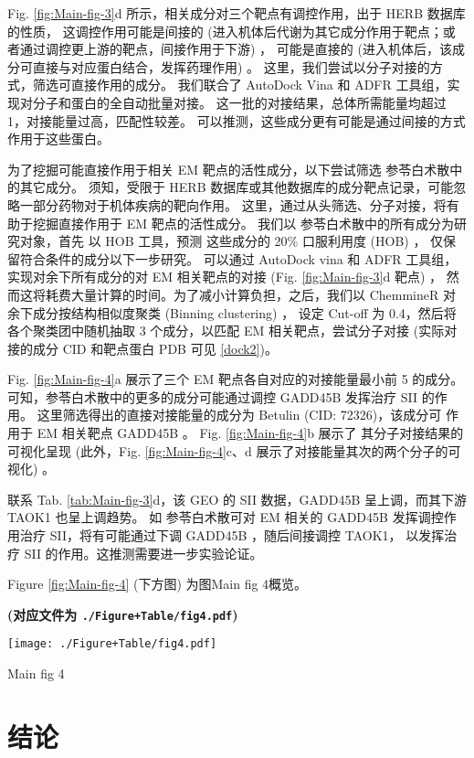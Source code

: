 \documentclass[
]{article}
\begin{document}
Fig. \ref{fig:Main-fig-3}d 所示，相关成分对三个靶点有调控作用，出于 HERB 数据库的性质，
这调控作用可能是间接的 (进入机体后代谢为其它成分作用于靶点；或者通过调控更上游的靶点，间接作用于下游) ，
可能是直接的 (进入机体后，该成分可直接与对应蛋白结合，发挥药理作用) 。
这里，我们尝试以分子对接的方式，筛选可直接作用的成分。
我们联合了 AutoDock Vina 和 ADFR 工具组，实现对分子和蛋白的全自动批量对接。
这一批的对接结果，总体所需能量均超过 1，对接能量过高，匹配性较差。
可以推测，这些成分更有可能是通过间接的方式作用于这些蛋白。

为了挖掘可能直接作用于相关 EM 靶点的活性成分，以下尝试筛选 参苓白术散中的其它成分。
须知，受限于 HERB 数据库或其他数据库的成分靶点记录，可能忽略一部分药物对于机体疾病的靶向作用。
这里，通过从头筛选、分子对接，将有助于挖掘直接作用于 EM 靶点的活性成分。
我们以 参苓白术散中的所有成分为研究对象，首先 以 HOB 工具，预测 这些成分的 20\% 口服利用度 (HOB) ，
仅保留符合条件的成分以下一步研究。
可以通过 AutoDock vina 和 ADFR 工具组，实现对余下所有成分的对 EM 相关靶点的对接 (Fig. \ref{fig:Main-fig-3}d 靶点) ，
然而这将耗费大量计算的时间。为了减小计算负担，之后，我们以 ChemmineR 对 余下成分按结构相似度聚类 (Binning clustering) ，
设定 Cut-off 为 0.4，然后将各个聚类团中随机抽取 3 个成分，以匹配 EM 相关靶点，尝试分子对接
(实际对接的成分 CID 和靶点蛋白 PDB 可见 \ref{dock2})。

Fig. \ref{fig:Main-fig-4}a 展示了三个 EM 靶点各自对应的对接能量最小前 5 的成分。
可知，参苓白术散中的更多的成分可能通过调控 GADD45B 发挥治疗 SII 的作用。
这里筛选得出的直接对接能量的成分为 Betulin (CID: 72326)，该成分可 作用于 EM 相关靶点 GADD45B 。
Fig. \ref{fig:Main-fig-4}b 展示了 其分子对接结果的可视化呈现 (此外，Fig. \ref{fig:Main-fig-4}c、d
展示了对接能量其次的两个分子的可视化) 。

联系 Tab. \ref{tab:Main-fig-3}d，该 GEO 的 SII 数据，GADD45B 呈上调，而其下游 TAOK1 也呈上调趋势。
如 参苓白术散可对 EM 相关的 GADD45B 发挥调控作用治疗 SII，将有可能通过下调 GADD45B ，随后间接调控 TAOK1，
以发挥治疗 SII 的作用。这推测需要进一步实验论证。

Figure \ref{fig:Main-fig-4} (下方图) 为图Main fig 4概览。

\textbf{(对应文件为 \texttt{./Figure+Table/fig4.pdf})}

\def\@captype{figure}
\begin{center}
\texttt{[image: ./Figure+Table/fig4.pdf]}
\caption{Main fig 4}\label{fig:Main-fig-4}
\end{center}

\hypertarget{dis}{%
\section{结论}\label{dis}}
\end{document}
